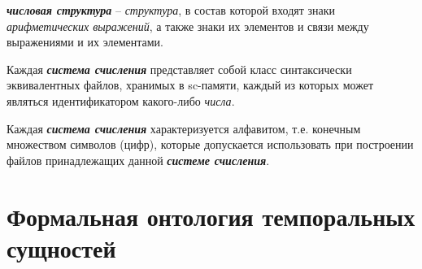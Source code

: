 %	
%	
%	
\begin{SCn}
\end{SCn}

\textbf{\textit{числовая структура}} -- \textit{структура}, в состав которой входят знаки \textit{арифметических выражений}, а также знаки их элементов и связи между выражениями и их элементами.
	
\begin{SCn}
\end{SCn}

Каждая \textbf{\textit{система счисления}} представляет собой класс синтаксически эквивалентных файлов, хранимых в sc-памяти, каждый из которых может являться идентификатором какого-либо \textit{числа}.
		
Каждая \textbf{\textit{система счисления}} характеризуется алфавитом, т.е. конечным множеством символов (цифр), которые допускается использовать при построении файлов принадлежащих данной \textbf{\textit{системе счисления}}.
	
%	
%	
	
\section{Формальная онтология темпоральных сущностей}
\label{sec_top_ontologies_temp}
		
